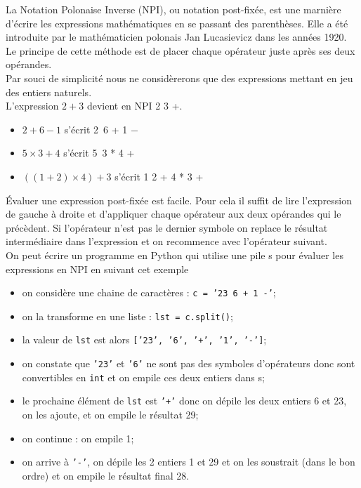 \documentclass[10pt,cours,firamath,a4paper]{nsi}
\begin{document}
\begin{exercice}
La Notation Polonaise Inverse (NPI), ou notation post-fixée, est une marnière d'écrire les expressions mathématiques en se passant des parenthèses. Elle a été introduite par le mathématicien polonais Jan Lucasievicz dans les années 1920.\\
Le principe de cette méthode est de placer chaque opérateur juste après ses deux opérandes.\\
Par souci de simplicité nous ne considèrerons que des expressions mettant en jeu des entiers naturels.\\

L'expression $2 + 3$ devient en NPI  2 3 +.
\begin{itemize}
	\item $2 + 6 − 1 $ s'écrit  2\ 6 + 1 −
	\item $5 \times 3 + 4$ s'écrit  5\ 3 * 4 +
	\item $((1 + 2) \times 4) + 3$ s'écrit 1 2 + 4 * 3 +
\end{itemize}

\'Evaluer une expression post-fixée est facile. Pour cela il suffit de lire l'expression de gauche à
droite et d'appliquer chaque opérateur aux deux opérandes qui le précèdent. Si l'opérateur n'est
pas le dernier symbole on replace le résultat intermédiaire dans l'expression et on recommence avec
l'opérateur suivant.\\

On peut écrire un programme en Python qui utilise une pile s pour évaluer les expressions en NPI en suivant cet exemple
\begin{itemize}
	\item 	on considère une chaine de caractères : \texttt{c = '23 6 + 1 -'};
	\item 	on la transforme en une liste : \texttt{lst = c.split()};
	\item 	la valeur de \texttt{lst} est alors \texttt{['23', '6', '+', '1', '-']};
	\item 	on constate que \texttt{'23'} et \texttt{'6'} ne sont pas des symboles d'opérateurs donc sont convertibles en \texttt{int} et on empile ces deux entiers dans s;
 	\item 	le prochaine élément de \texttt{lst} est \texttt{'+'} donc on dépile les deux entiers 6 et 23, on les ajoute, et on empile le résultat 29;
 	\item	on continue : on empile 1;
 	\item	on arrive à \texttt{'-'}, on dépile les 2 entiers  1 et 29 et on les soustrait (dans le bon ordre) et on empile le résultat final 28.
\end{itemize}


\end{exercice}
\end{document}
